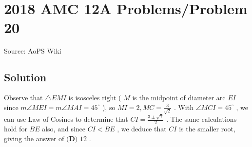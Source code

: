 \documentclass[12pt]{article}
\begin{document}
\section*{{2018 AMC 12A Problems/Problem 20}}
Source: AoPS Wiki

\subsection*{Solution}
Observe that $\triangle{EMI}$ is isosceles right ( $M$ is the midpoint of diameter arc $EI$ since $m\angle MEI = m\angle MAI = 45^\circ$ ), so $MI=2,MC=\frac{3}{\sqrt{2}}$ . With $\angle{MCI}=45^\circ$ , we can use Law of Cosines to determine that $CI=\frac{3\pm\sqrt{7}}{2}$ . The same calculations hold for $BE$ also, and since $CI<BE$ , we deduce that $CI$ is the smaller root, giving the answer of $\boxed{\textbf{(D) }12}$ .
\end{document}
